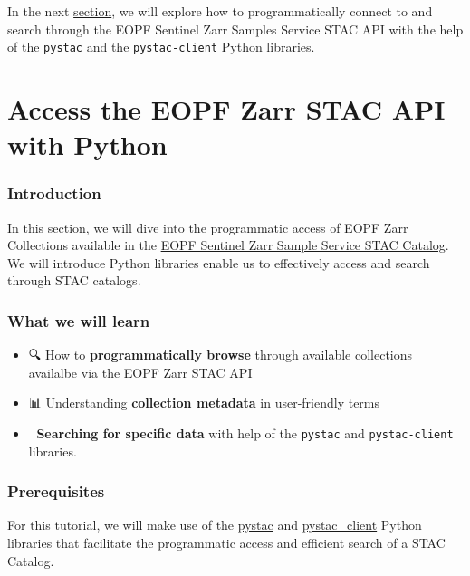 \documentclass[
  letterpaper,
  DIV=11,
  numbers=noendperiod]{scrreprt}
\providecommand{\tightlist}{%
  \setlength{\itemsep}{0pt}\setlength{\parskip}{0pt}}
\begin{document}
In the next \href{./33_eopf_stac_connection.ipynb}{section}, we will
explore how to programmatically connect to and search through the EOPF
Sentinel Zarr Samples Service STAC API with the help of the
\texttt{pystac} and the \texttt{pystac-client} Python libraries.

\chapter{Access the EOPF Zarr STAC API with
Python}\label{access-the-eopf-zarr-stac-api-with-python}

\subsection{Introduction}\label{introduction-7}

In this section, we will dive into the programmatic access of EOPF Zarr
Collections available in the
\href{https://stac.browser.user.eopf.eodc.eu/?.language=en}{EOPF
Sentinel Zarr Sample Service STAC Catalog}. We will introduce Python
libraries enable us to effectively access and search through STAC
catalogs.

\subsection{What we will learn}\label{what-we-will-learn-6}

\begin{itemize}
\tightlist
\item
  🔍 How to \textbf{programmatically browse} through available
  collections availalbe via the EOPF Zarr STAC API
\item
  📊 Understanding \textbf{collection metadata} in user-friendly terms
\item
  🎯 \textbf{Searching for specific data} with help of the
  \texttt{pystac} and \texttt{pystac-client} libraries.
\end{itemize}

\subsection{Prerequisites}\label{prerequisites-1}

For this tutorial, we will make use of the
\href{https://pystac.readthedocs.io/en/stable/}{pystac} and
\href{https://pystac-client.readthedocs.io/en/latest/api.html}{pystac\_client}
Python libraries that facilitate the programmatic access and efficient
search of a STAC Catalog.
\end{document}
